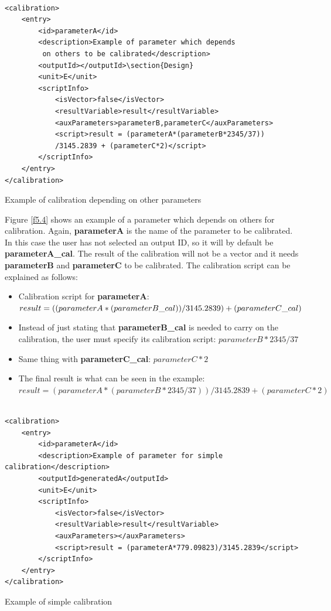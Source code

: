 \begin{table}[H]
\lstset{language=XML}
\begin{lstlisting}

<calibration>
	<entry>
		<id>parameterA</id>
		<description>Example of parameter which depends
		 on others to be calibrated</description>
		<outputId></outputId>\section{Design}
		<unit>E</unit>
		<scriptInfo>
			<isVector>false</isVector>
			<resultVariable>result</resultVariable>
			<auxParameters>parameterB,parameterC</auxParameters>
			<script>result = (parameterA*(parameterB*2345/37))
			/3145.2839 + (parameterC*2)</script>
		</scriptInfo>
	</entry>
</calibration>
\end{lstlisting}
\caption{Example of calibration depending on other parameters}
\label{Table5.3}
\end{table}

Figure \ref{f5.4} shows an example of a parameter which depends on others for calibration. Again, \textbf{parameterA} is the name of the parameter to be calibrated. In this case the user has not selected an output ID, so it will by default be \textbf{parameterA\_cal}. The result of the calibration will not be a vector and it needs \textbf{parameterB} and \textbf{parameterC} to be calibrated. The calibration script can be explained as follows:
\begin{itemize}
\item Calibration script for \textbf{parameterA}: $result = ((parameterA*(parameterB\_cal))\\			/3145.2839) + (parameterC\_cal)$
\item Instead of just stating that \textbf{parameterB\_cal} is needed to carry on the calibration, the user must specify its calibration script: $parameterB*2345/37$
\item Same thing with \textbf{parameterC\_cal}: $parameterC*2$
\item The final result is what can be seen in the example: $result = (parameterA*(parameterB*2345/37))/3145.2839 + (parameterC*2)$
\end{itemize}
\begin{table}[H]
\lstset{language=XML}
\begin{lstlisting}

<calibration>
	<entry>
		<id>parameterA</id>
		<description>Example of parameter for simple calibration</description>
		<outputId>generatedA</outputId>
		<unit>E</unit>
		<scriptInfo>
			<isVector>false</isVector>
			<resultVariable>result</resultVariable>
			<auxParameters></auxParameters>
			<script>result = (parameterA*779.09823)/3145.2839</script>
		</scriptInfo>
	</entry>
</calibration>
\end{lstlisting}
\caption{Example of simple calibration}
\label{Table5.4}
\end{table}


